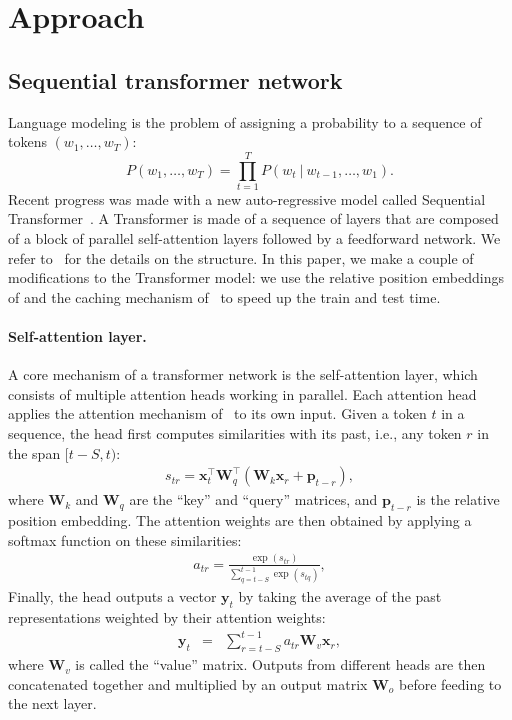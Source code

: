 \documentclass[11pt,a4paper]{article}
\begin{document}
\section{Approach}

\subsection{Sequential transformer network}
\label{sec:fixed}

Language modeling is the problem of assigning a probability to a sequence of tokens $(w_1,\dots,w_T)$:
$$P(w_1,\dots,w_T) = \prod_{t=1}^T P(w_t~|~w_{t-1},\dots,w_1).$$
Recent progress was made with a new auto-regressive model called Sequential Transformer~\citep{vaswani2017attention}.
A Transformer is made of a sequence of layers that are composed of a block of parallel self-attention layers followed by a feedforward network.
We refer to~\citet{vaswani2017attention} for the details on the structure.
In this paper, we make a couple of modifications to the Transformer model:
we use the relative position embeddings of \citet{shaw2018self} and the caching mechanism of~\citet{dai2018transformer} to speed up the train and test time.

\paragraph{Self-attention layer.}
A core mechanism of a transformer network is the self-attention layer, which consists of multiple attention heads working in parallel.
Each attention head applies the attention mechanism of~\citet{bahdanau2014neural} to its own input.
Given a token $t$ in a sequence, the head first computes similarities with its past, i.e., any token $r$ in the span $[t-S,t)$:
\begin{eqnarray}
  s_{tr}=\mathbf{x}_t^\top \mathbf{W}_q^\top \left( \mathbf{W}_k \mathbf{x}_r + \mathbf{p}_{t-r} \right),
\end{eqnarray}
where $\mathbf{W}_k$ and $\mathbf{W}_q$ are the ``key'' and ``query'' matrices, and $\mathbf{p}_{t-r}$ is the relative position embedding.
The attention weights are then obtained by applying a softmax function on these similarities:
\begin{eqnarray}\label{eq:att}
  a_{tr}=\frac{\exp\left( s_{tr} \right)}{\sum_{q=t-S}^{t-1}\exp\left( s_{tq}\right)},
\end{eqnarray}
Finally, the head outputs a vector $\mathbf{y}_t$ by taking the average of the past representations weighted by their attention weights:
\begin{eqnarray}
  \label{eq:output}
  \mathbf{y}_t &=& \sum_{r=t-S}^{t-1} a_{tr} \mathbf{W}_v \mathbf{x}_r,
\end{eqnarray}
where $\mathbf{W}_v$ is called the ``value'' matrix. Outputs from different heads are then concatenated together and multiplied by an output matrix $\mathbf{W}_o$ before feeding to the next layer.
\end{document}
